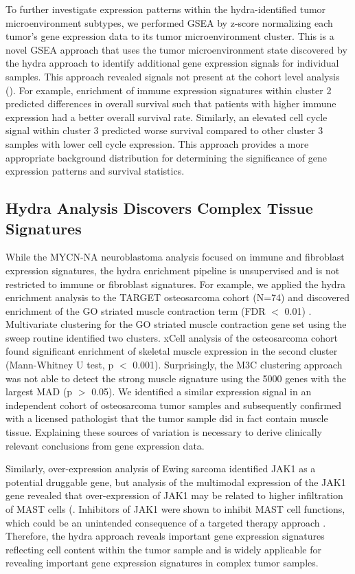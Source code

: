 \documentclass[10pt,letterpaper]{article}
\begin{document}
To further investigate expression patterns within the hydra-identified tumor microenvironment subtypes, we performed GSEA by z-score normalizing each tumor’s gene expression data to its tumor microenvironment cluster. This is a novel GSEA approach that uses the tumor microenvironment state discovered by the hydra approach to identify additional gene expression signals for individual samples. This approach revealed signals not present at the cohort level analysis (). For example, enrichment of immune expression signatures within cluster 2 predicted differences in overall survival such that patients with higher immune expression had a better overall survival rate. Similarly, an elevated cell cycle signal within cluster 3 predicted worse survival compared to other cluster 3 samples with lower cell cycle expression. This approach provides a more appropriate background distribution for determining the significance of gene expression patterns and survival statistics.

\subsection{Hydra Analysis Discovers Complex Tissue Signatures}
While the MYCN-NA neuroblastoma analysis focused on immune and fibroblast expression signatures, the hydra enrichment pipeline is unsupervised and is not restricted to immune or fibroblast signatures. For example, we applied the hydra enrichment analysis to the TARGET osteosarcoma cohort (N=74) and discovered enrichment of the GO striated muscle contraction term (FDR $<$ 0.01) . Multivariate clustering for the GO striated muscle contraction gene set using the sweep routine identified two clusters. xCell analysis of the osteosarcoma cohort found significant enrichment of skeletal muscle expression in the second cluster (Mann-Whitney U test, p $<$ 0.001). Surprisingly, the M3C clustering approach was not able to detect the strong muscle signature using the 5000 genes with the largest MAD (p $>$ 0.05). We identified a similar expression signal in an independent cohort of osteosarcoma tumor samples and subsequently confirmed with a licensed pathologist that the tumor sample did in fact contain muscle tissue. Explaining these sources of variation is necessary to derive clinically relevant conclusions from gene expression data. 

Similarly, over-expression analysis of Ewing sarcoma identified JAK1 as a potential druggable gene, but analysis of the multimodal expression of the JAK1 gene revealed that over-expression of JAK1 may be related to higher infiltration of MAST cells (. Inhibitors of JAK1 were shown to inhibit MAST cell functions, which could be an unintended consequence of a targeted therapy approach \cite{hermansJAK1JAK2Inhibitor2018}. Therefore, the hydra approach reveals important gene expression signatures reflecting cell content within the tumor sample and is widely applicable for revealing important gene expression signatures in complex tumor samples.
\end{document}
